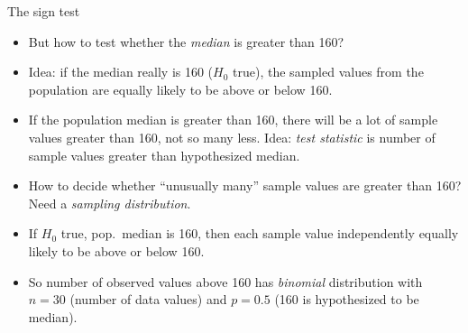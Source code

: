 \documentclass[unknownkeysallowed]{beamer}\usepackage[]{graphicx}\usepackage[]{color}
\begin{document}
\begin{frame}[fragile]{The sign test}
  
  \begin{itemize}
  \item But how to test whether the \emph{median} is greater than 160?
  \item Idea: if the median really is 160 ($H_0$ true), the sampled
    values from the population are equally likely to be above or below
    160.
  \item If the population median is greater than 160, there will be a
    lot of sample values greater than 160, not so many less. Idea:
    \emph{test statistic} is number of sample values greater than
    hypothesized median.
  \item How to decide whether ``unusually many'' sample values are
    greater than 160? Need a \emph{sampling distribution}.
  \item If $H_0$ true, pop.\ median is 160, then each sample value
    independently equally likely to be above or below 160.
  \item So number of observed values above 160 has \emph{binomial}
    distribution with $n=30$ (number of data values) and $p=0.5$ (160
    is hypothesized to be median).
  \end{itemize}
  
\end{frame}
\end{document}
